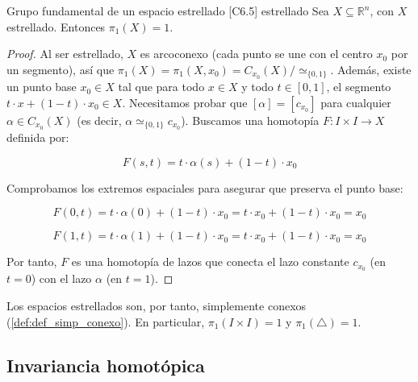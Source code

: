 \begin{proposicion}{Grupo fundamental de un espacio estrellado [C6.5] \marcaE}{estrellado}
Sea $X \subseteq \mathbb{R}^n$, con $X$ estrellado. Entonces $\pi_1(X) = 1$.

\begin{proof}
Al ser estrellado, $X$ es arcoconexo (cada punto se une con el centro $x_0$ por un segmento), así que $\pi_1(X) = \pi_1(X, x_0) = C_{x_0}(X) / \simeq_{\{0,1\}}$. Además, existe un punto base $x_0 \in X$ tal que para todo $x \in X$ y todo $t \in [0,1]$, el segmento $t \cdot x + (1-t) \cdot x_0 \in X$.
Necesitamos probar que $[\alpha] = [c_{x_0}]$ para cualquier $\alpha \in C_{x_0}(X)$ (es decir, $\alpha \simeq_{\{0,1\}} c_{x_0}$).
Buscamos una homotopía $F \colon I \times I \longrightarrow X$ definida por:


$$F(s,t) = t \cdot \alpha(s) + (1-t) \cdot x_0$$


Comprobamos los extremos espaciales para asegurar que preserva el punto base:


$$F(0, t) = t \cdot \alpha(0) + (1-t) \cdot x_0 = t \cdot x_0 + (1-t) \cdot x_0 = x_0$$

$$F(1, t) = t \cdot \alpha(1) + (1-t) \cdot x_0 = t \cdot x_0 + (1-t) \cdot x_0 = x_0$$


Por tanto, $F$ es una homotopía de lazos que conecta el lazo constante $c_{x_0}$ (en $t=0$) con el lazo $\alpha$ (en $t=1$).
\end{proof}
\end{proposicion}

Los espacios estrellados son, por tanto, simplemente conexos (\cref{def:def_simp_conexo}). En particular, $\pi_1(I \times I) = 1$ y $\pi_1(\triangle) = 1$.

\subsection{Invariancia homotópica}

